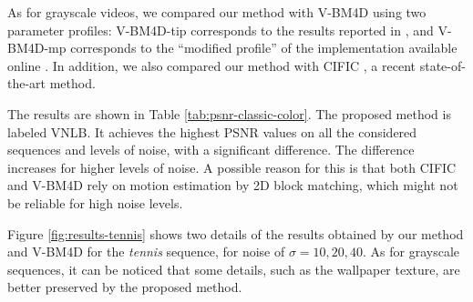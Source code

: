 \documentclass[10pt, journal, twocolumn, final, a4paper]{IEEEtran}
\begin{document}
As for grayscale videos, we compared our method with V-BM4D using two parameter profiles:
V-BM4D-tip corresponds to the results reported in \cite{Maggioni2012}, and
V-BM4D-mp corresponds to the ``modified profile''
of the implementation available online \cite{bm4dcode}.
In addition, we also compared our method with CIFIC \cite{Dai2013}, a recent
state-of-the-art method.

The results are shown in Table \ref{tab:psnr-classic-color}. The proposed method is
labeled VNLB. It achieves the highest PSNR values on all the considered
sequences and levels of noise, with a significant difference. The difference
increases for higher levels of noise. A possible reason for this is that both 
CIFIC and V-BM4D rely on motion estimation by 2D block matching, which might
not be reliable for high noise levels.


Figure \ref{fig:results-tennis} 
shows two details of the results obtained by our method and V-BM4D for the
\emph{tennis} sequence, for noise of $\sigma = 10, 20, 40$. As for grayscale
sequences, it can be noticed that some details, such as the wallpaper texture,
are better preserved by the proposed method. 

%
%
%
\end{document}
